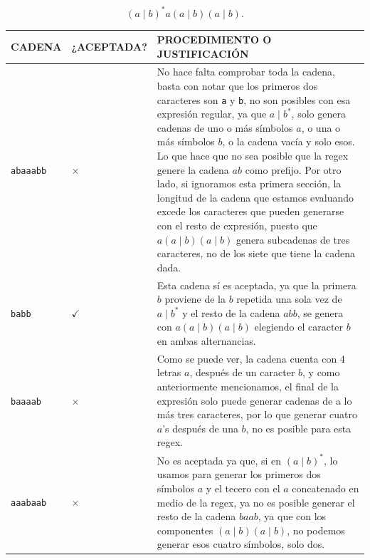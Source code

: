 \documentclass[12pt,letterpaper]{article}
\newcommand{\greencheck}{\textcolor{green_checkmark}{$\checkmark$}}
\newcommand{\redcross}{\textcolor{red_cross}{$\times$}}
\begin{document}
\begin{enumerate}[label=\arabic*.]
\[
(a\mid b)^*a(a\mid b)(a\mid b).
\]

\begin{table}[H]
\centering

\renewcommand{\arraystretch}{1.5}

\hspace*{-0.2cm}
\begin{tabular}{
    |C{2.5cm}
    |C{3.3cm}
    |C{10cm}|
}

\hline

\textbf{CADENA} &
\textbf{¿ACEPTADA?} &
\textbf{PROCEDIMIENTO O JUSTIFICACIÓN}
\\
\hline

\texttt{abaaabb} & \redcross
& No hace falta comprobar toda la cadena, basta con notar que los primeros dos caracteres son \texttt{a} y
\texttt{b}, no son posibles con esa expresión regular, ya que $a \mid b^*$, solo genera cadenas de uno o más
símbolos $a$, o una o más símbolos $b$, o la cadena vacía y solo esos. Lo que hace que no sea posible que la
regex genere la cadena $ab$ como prefijo. Por otro lado, si ignoramos esta primera sección, la longitud de la
cadena que estamos evaluando excede los caracteres que pueden generarse con el resto de expresión, puesto que
$a(a \mid b)(a \mid b)$ genera subcadenas de tres caracteres, no de los siete que tiene la cadena dada.
\\
\hline

\texttt{babb} & \greencheck
& Esta cadena sí es aceptada, ya que la primera $b$ proviene de la $b$ repetida una sola vez de
$a \mid b^*$ y el resto de la cadena $abb$, se genera con $a(a \mid b)(a \mid b)$ elegiendo el
caracter $b$ en ambas alternancias.
\\
\hline

\texttt{baaaab} & \redcross
& Como se puede ver, la cadena cuenta con 4 letras $a$, después de un caracter $b$, y como anteriormente
mencionamos, el final de la expresión solo puede generar cadenas de a lo más tres caracteres, por lo que generar
cuatro $a$'s después de una $b$, no es posible para esta regex.
\\
\hline

\texttt{aaabaab} & \redcross
& No es aceptada ya que, si en $(a \mid b)^*$, lo usamos para generar los primeros dos símbolos $a$ y el tecero
con el $a$ concatenado en medio de la regex, ya no es posible generar el resto de la cadena $baab$, ya que con
los componentes $(a \mid b)(a \mid b)$, no podemos generar esos cuatro símbolos, solo dos.
\\
\hline


\end{tabular}
\end{table}
\end{enumerate}
\end{document}
